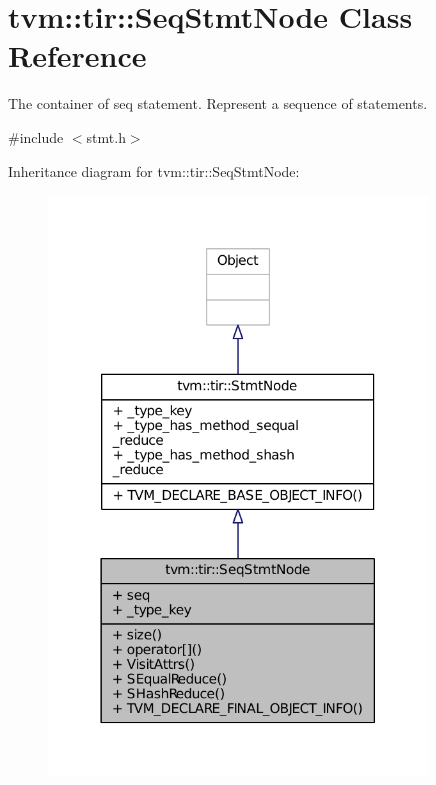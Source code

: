 \hypertarget{classtvm_1_1tir_1_1SeqStmtNode}{}\section{tvm\+:\+:tir\+:\+:Seq\+Stmt\+Node Class Reference}
\label{classtvm_1_1tir_1_1SeqStmtNode}


The container of seq statement. Represent a sequence of statements.  




{\ttfamily \#include $<$stmt.\+h$>$}



Inheritance diagram for tvm\+:\+:tir\+:\+:Seq\+Stmt\+Node\+:
\nopagebreak
\begin{figure}[H]
\begin{center}
\leavevmode
\includegraphics[width=285pt]{classtvm_1_1tir_1_1SeqStmtNode__inherit__graph}
\end{center}
\end{figure}


